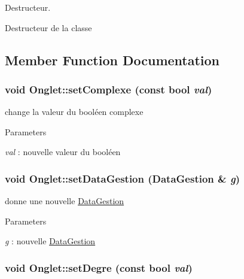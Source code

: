 Destructeur. 

Destructeur de la classe 

\subsection{Member Function Documentation}
\hypertarget{classOnglet_ab1cadfd837be3e849bca41691cb0b856}{
\subsubsection[{setComplexe}]{\setlength{\rightskip}{0pt plus 5cm}void Onglet::setComplexe (const bool {\em val})}}
\label{classOnglet_ab1cadfd837be3e849bca41691cb0b856}


change la valeur du booléen complexe 


\begin{DoxyParams}{Parameters}
\item[{\em val}]: nouvelle valeur du booléen \end{DoxyParams}
\hypertarget{classOnglet_a37c3fd19396bff952d901a1e5b0f05e8}{
\subsubsection[{setDataGestion}]{\setlength{\rightskip}{0pt plus 5cm}void Onglet::setDataGestion ({\bf DataGestion} \& {\em g})}}
\label{classOnglet_a37c3fd19396bff952d901a1e5b0f05e8}


donne une nouvelle \hyperlink{classDataGestion}{DataGestion} 


\begin{DoxyParams}{Parameters}
\item[{\em g}]: nouvelle \hyperlink{classDataGestion}{DataGestion} \end{DoxyParams}
\hypertarget{classOnglet_a534eb5c74e28ccd52c97f5ee69cb7d93}{
\subsubsection[{setDegre}]{\setlength{\rightskip}{0pt plus 5cm}void Onglet::setDegre (const bool {\em val})}}
\label{classOnglet_a534eb5c74e28ccd52c97f5ee69cb7d93}


